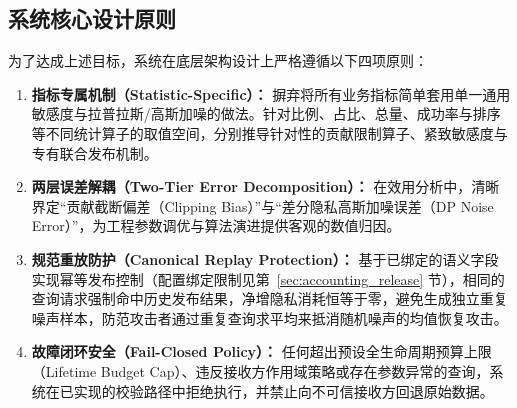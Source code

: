 \subsection{系统核心设计原则}
为了达成上述目标，系统在底层架构设计上严格遵循以下四项原则：
\begin{enumerate}[label=\textbf{原则\arabic*：}, leftmargin=4.5em]
  \item \textbf{指标专属机制（Statistic-Specific）：} 摒弃将所有业务指标简单套用单一通用敏感度与拉普拉斯/高斯加噪的做法。针对比例、占比、总量、成功率与排序等不同统计算子的取值空间，分别推导针对性的贡献限制算子、紧致敏感度与专有联合发布机制。
  \item \textbf{两层误差解耦（Two-Tier Error Decomposition）：} 在效用分析中，清晰界定“贡献截断偏差（Clipping Bias）”与“差分隐私高斯加噪误差（DP Noise Error）”，为工程参数调优与算法演进提供客观的数值归因。
  \item \textbf{规范重放防护（Canonical Replay Protection）：} 基于已绑定的语义字段实现幂等发布控制（配置绑定限制见第~\ref{sec:accounting_release} 节），相同的查询请求强制命中历史发布结果，净增隐私消耗恒等于零，避免生成独立重复噪声样本，防范攻击者通过重复查询求平均来抵消随机噪声的均值恢复攻击。
  \item \textbf{故障闭环安全（Fail-Closed Policy）：} 任何超出预设全生命周期预算上限（Lifetime Budget Cap）、违反接收方作用域策略或存在参数异常的查询，系统在已实现的校验路径中拒绝执行，并禁止向不可信接收方回退原始数据。
\end{enumerate}
